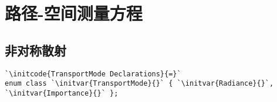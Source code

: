 \section{路径-空间测量方程}\label{sec:路径-空间测量方程}

\subsection{非对称散射}\label{sub:非对称散射}
\begin{lstlisting}
`\initcode{TransportMode Declarations}{=}`
enum class `\initvar{TransportMode}{}` { `\initvar{Radiance}{}`, `\initvar{Importance}{}` };
\end{lstlisting}